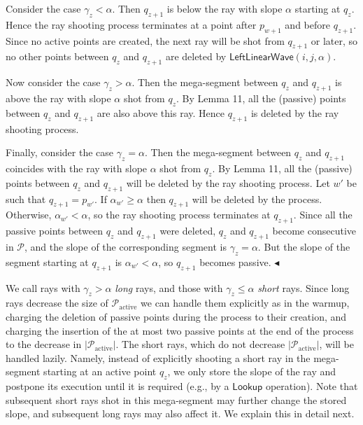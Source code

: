 \documentclass[11pt]{article}
\newcommand{\Pset}{\mathcal{P}}
\newcommand{\Pact}{\mathcal{P}_{\mathrm{active}}}
\newcommand{\Lwave}{\ensuremath{\mathsf{LeftLinearWave}}}
\begin{document}
Consider the case $\gamma_z < \alpha$. Then $q_{z+1}$ is below the ray with slope $\alpha$ starting at $q_z$. Hence
the ray shooting process terminates at a point after $p_{w+1}$ and before $q_{z+1}$. Since no active
points are created, the next ray will be shot from $q_{z+1}$ or later, so no other points between
$q_z$ and $q_{z+1}$ are deleted by \Lwave$(i,j,\alpha)$.

Now consider the case $\gamma_z > \alpha$. Then the mega-segment between $q_z$ and $q_{z+1}$ is above the
ray with slope $\alpha$ shot from $q_z$. By Lemma 11, all the (passive) points between $q_z$ and $q_{z+1}$
are also above this ray. Hence $q_{z+1}$ is deleted by the ray shooting process.

Finally, consider the case $\gamma_z = \alpha$. Then the mega-segment between $q_z$ and $q_{z+1}$ coincides
with the ray with slope $\alpha$ shot from $q_z$. By Lemma 11, all the (passive) points between $q_z$
and $q_{z+1}$ will be deleted by the ray shooting process. Let $w'$ be such that $q_{z+1} = p_{w'}$. If
$\alpha_{w'} \ge \alpha$ then $q_{z+1}$ will be deleted by the process. Otherwise, $\alpha_{w'} < \alpha$, so the ray shooting
process terminates at $q_{z+1}$. Since all the passive points between $q_z$ and $q_{z+1}$ were deleted, $q_z$
and $q_{z+1}$ become consecutive in $\Pset$, and the slope of the corresponding segment is $\gamma_z = \alpha$.
But the slope of the segment starting at $q_{z+1}$ is $\alpha_{w'} < \alpha$, so $q_{z+1}$ becomes passive. \hfill$\blacktriangleleft$

\smallskip
We call rays with $\gamma_z > \alpha$ \emph{long} rays, and those with $\gamma_z \le \alpha$ \emph{short} rays. Since long rays
decrease the size of $\Pact$ we can handle them explicitly as in the warmup, charging the
deletion of passive points during the process to their creation, and charging the insertion
of the at most two passive points at the end of the process to the decrease in $|\Pact|$. The
short rays, which do not decrease $|\Pact|$, will be handled lazily. Namely, instead of explicitly
shooting a short ray in the mega-segment starting at an active point $q_z$, we only store the
slope of the ray and postpone its execution until it is required (e.g., by a \ensuremath{\mathsf{Lookup}} operation).
Note that subsequent short rays shot in this mega-segment may further change the stored
slope, and subsequent long rays may also affect it. We explain this in detail next.

\end{document}
